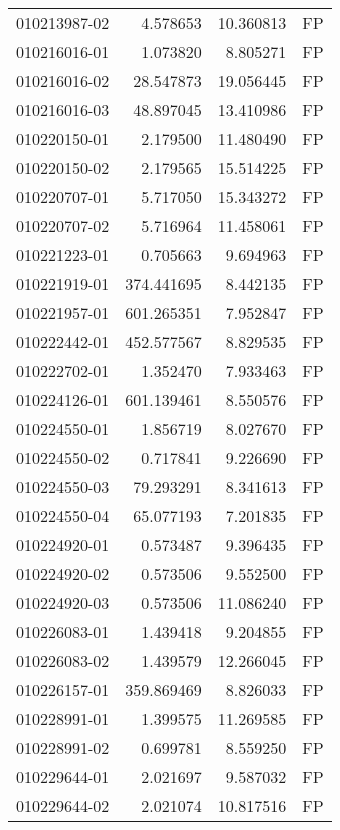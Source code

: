 \begin{tabular}{lrrl}
010213987-02 &    4.578653 &      10.360813 &   FP \\
010216016-01 &    1.073820 &       8.805271 &   FP \\
010216016-02 &   28.547873 &      19.056445 &   FP \\
010216016-03 &   48.897045 &      13.410986 &   FP \\
010220150-01 &    2.179500 &      11.480490 &   FP \\
010220150-02 &    2.179565 &      15.514225 &   FP \\
010220707-01 &    5.717050 &      15.343272 &   FP \\
010220707-02 &    5.716964 &      11.458061 &   FP \\
010221223-01 &    0.705663 &       9.694963 &   FP \\
010221919-01 &  374.441695 &       8.442135 &   FP \\
010221957-01 &  601.265351 &       7.952847 &   FP \\
010222442-01 &  452.577567 &       8.829535 &   FP \\
010222702-01 &    1.352470 &       7.933463 &   FP \\
010224126-01 &  601.139461 &       8.550576 &   FP \\
010224550-01 &    1.856719 &       8.027670 &   FP \\
010224550-02 &    0.717841 &       9.226690 &   FP \\
010224550-03 &   79.293291 &       8.341613 &   FP \\
010224550-04 &   65.077193 &       7.201835 &   FP \\
010224920-01 &    0.573487 &       9.396435 &   FP \\
010224920-02 &    0.573506 &       9.552500 &   FP \\
010224920-03 &    0.573506 &      11.086240 &   FP \\
010226083-01 &    1.439418 &       9.204855 &   FP \\
010226083-02 &    1.439579 &      12.266045 &   FP \\
010226157-01 &  359.869469 &       8.826033 &   FP \\
010228991-01 &    1.399575 &      11.269585 &   FP \\
010228991-02 &    0.699781 &       8.559250 &   FP \\
010229644-01 &    2.021697 &       9.587032 &   FP \\
010229644-02 &    2.021074 &      10.817516 &   FP \\

\end{tabular}
